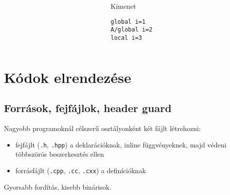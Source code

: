 \documentclass[usenames,dvipsnames,aspectratio=169]{beamer}
\begin{document}
\begin{frame}[fragile]
    \begin{columns}
        \begin{column}{0.75\textwidth}
            \begin{exampleblock}{}
                \scriptsize
                
            \end{exampleblock}
        \end{column}
        \begin{column}{0.25\textwidth}
            \begin{block}{Kimenet}
                \begin{verbatim}
global i=1
A/global i=2
local i=3
\end{verbatim}
            \end{block}
        \end{column}
    \end{columns}
\end{frame}

\section{Kódok elrendezése}

\subsection{Források, fejfájlok, header guard}

\begin{frame}
    Nagyobb programoknál célszerű osztályonként két fájlt létrehozni:
    \begin{itemize}
        \item fejfájlt (\texttt{.h}, \texttt{.hpp}) a deklarációknak, inline függvényeknek, majd védeni többszörös beszerkesztés ellen
        \item forrásfájlt (\texttt{.cpp}, \texttt{.cc}, \texttt{.cxx}) a definícióknak
    \end{itemize}
    Gyorsabb fordítás, kisebb binárisok.
    \begin{exampleblock}{}
        \footnotesize
        
    \end{exampleblock}
\end{frame}
\end{document}

